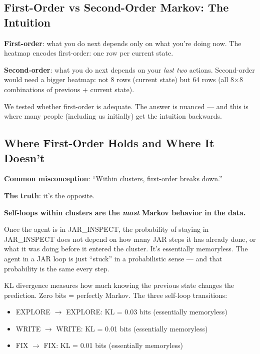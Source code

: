 \documentclass[11pt,a4paper]{article}
\begin{document}
\subsection*{First-Order vs Second-Order Markov: The Intuition}

\textbf{First-order}: what you do next depends only on what you're doing now.
The heatmap encodes first-order: one row per current state.

\textbf{Second-order}: what you do next depends on your \emph{last two} actions.
Second-order would need a bigger heatmap: not 8 rows (current state)
but 64 rows (all 8$\times$8 combinations of previous + current state).

We tested whether first-order is adequate.
The answer is nuanced --- and this is where many people (including us initially)
get the intuition backwards.

\subsection*{Where First-Order Holds and Where It Doesn't}
\label{sec:honest}

\begin{warningbox}
\textbf{Common misconception}: ``Within clusters, first-order breaks down.''

\textbf{The truth}: it's the opposite.
\end{warningbox}

\textbf{Self-loops within clusters are the \emph{most} Markov behavior in the data.}

Once the agent is in JAR\_INSPECT, the probability of staying in JAR\_INSPECT
does not depend on how many JAR steps it has already done, or what it was doing
before it entered the cluster.
It's essentially memoryless.
The agent in a JAR loop is just ``stuck'' in a probabilistic sense ---
and that probability is the same every step.

KL divergence measures how much knowing the previous state changes the prediction.
Zero bits = perfectly Markov. The three self-loop transitions:
\begin{itemize}
  \item EXPLORE $\to$ EXPLORE: KL = 0.03 bits (essentially memoryless)
  \item WRITE $\to$ WRITE: KL = 0.01 bits (essentially memoryless)
  \item FIX $\to$ FIX: KL = 0.01 bits (essentially memoryless)
\end{itemize}
\end{document}
